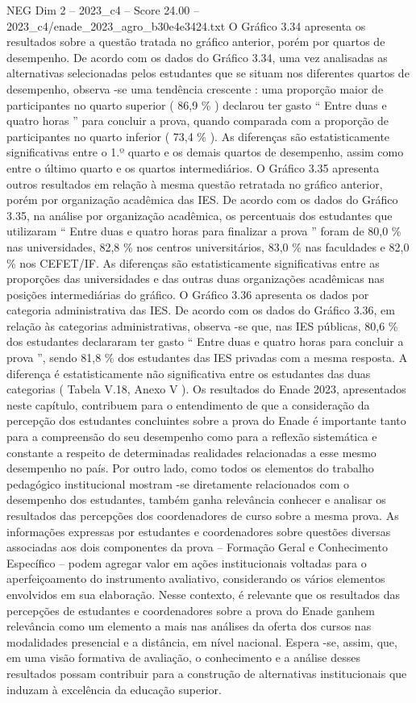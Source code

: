 \begin{textsample}{NEG Dim 2 – 2023\_c4 – Score 24.00 – 2023\_c4/enade\_2023\_agro\_b30e4e3424.txt}
O Gráfico 3.34 apresenta os resultados sobre a questão tratada no gráfico anterior, porém por quartos de desempenho.
De acordo com os dados do Gráfico 3.34, uma vez analisadas as alternativas selecionadas pelos estudantes que se situam nos diferentes quartos de desempenho, observa -se uma tendência crescente : uma proporção maior de participantes no quarto superior ( 86,9 \% ) declarou ter gasto “ Entre duas e quatro horas ” para concluir a prova, quando comparada com a proporção de participantes no quarto inferior ( 73,4 \% ).
As diferenças são estatisticamente significativas entre o 1.º quarto e os demais quartos de desempenho, assim como entre o último quarto e os quartos intermediários.
O Gráfico 3.35 apresenta outros resultados em relação à mesma questão retratada no gráfico anterior, porém por organização acadêmica das IES.
De acordo com os dados do Gráfico 3.35, na análise por organização acadêmica, os percentuais dos estudantes que utilizaram “ Entre duas e quatro horas para finalizar a prova ” foram de 80,0 \% nas universidades, 82,8 \% nos centros universitários, 83,0 \% nas faculdades e 82,0 \% nos CEFET/IF.
As diferenças são estatisticamente significativas entre as proporções das universidades e das outras duas organizações acadêmicas nas posições intermediárias do gráfico.
O Gráfico 3.36 apresenta os dados por categoria administrativa das IES.
De acordo com os dados do Gráfico 3.36, em relação às categorias administrativas, observa -se que, nas IES públicas, 80,6 \% dos estudantes declararam ter gasto “ Entre duas e quatro horas para concluir a prova ”, sendo 81,8 \% dos estudantes das IES privadas com a mesma resposta.
A diferença é estatisticamente não significativa entre os estudantes das duas categorias ( Tabela V.18, Anexo V ).
Os resultados do Enade 2023, apresentados neste capítulo, contribuem para o entendimento de que a consideração da percepção dos estudantes concluintes sobre a prova do Enade é importante tanto para a compreensão do seu desempenho como para a reflexão sistemática e constante a respeito de determinadas realidades relacionadas a esse mesmo desempenho no país.
Por outro lado, como todos os elementos do trabalho pedagógico institucional mostram -se diretamente relacionados com o desempenho dos estudantes, também ganha relevância conhecer e analisar os resultados das percepções dos coordenadores de curso sobre a mesma prova.
As informações expressas por estudantes e coordenadores sobre questões diversas associadas aos dois componentes da prova – Formação Geral e Conhecimento Específico – podem agregar valor em ações institucionais voltadas para o aperfeiçoamento do instrumento avaliativo, considerando os vários elementos envolvidos em sua elaboração.
Nesse contexto, é relevante que os resultados das percepções de estudantes e coordenadores sobre a prova do Enade ganhem relevância como um elemento a mais nas análises da oferta dos cursos nas modalidades presencial e a distância, em nível nacional.
Espera -se, assim, que, em uma visão formativa de avaliação, o conhecimento e a análise desses resultados possam contribuir para a construção de alternativas institucionais que induzam à excelência da educação superior.

\end{textsample}
